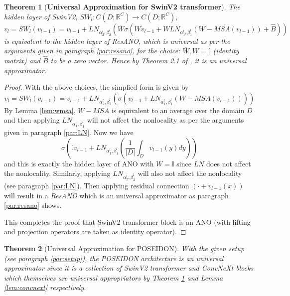 \documentclass[reqno,10pt]{amsart}
\theoremstyle{plain}
\newtheorem{thm}{Theorem}
\theoremstyle{definition}
\newcommand{\bb}[1]{\mathbb{#1}}
\begin{document}
\begin{thm}[{\bf Universal Approximation for SwinV2 transformer}] \label{thm:swinv2}
    The hidden layer of SwinV2, $SW_l : C(D;\bb R^C) \to C(D;\bb R^C)$,
    $$ v_l = SW_l(v_{l-1}) = v_{l-1} + LN_{\alpha_2^l, \beta_2^l} \left(\overline{W} \sigma \left( Wv_{l-1} + WLN_{\alpha_1^l,\beta_1^l}(W-MSA(v_{l-1})) + \hat{B}\right)\right)$$
    is equivalent to the hidden layer of ResANO, which is universal as per the arguments given in paragraph \ref{par:resano}, for the choice: $\overline{W}, W = \bb I$ (identity matrix) and $\hat{B}$ to be a zero vector. Hence by Theorem 2.1 of \cite{SL2024}, it is an universal approximator.
\end{thm}
\begin{proof}
    With the above choices, the simplied form is given by
    $$ v_l = SW_l(v_{l-1}) = v_{l-1} + LN_{\alpha_2^l, \beta_2^l} \left(\sigma \left(v_{l-1} + LN_{\alpha_1^l,\beta_1^l}(W-MSA(v_{l-1}))\right)\right)$$
    By Lemma \ref{lem:wmsa}, $W-MSA$ is equivalent to an average over the domain $D$ and then applying $LN_{\alpha_1^l, \beta_1^l}$ will not affect the nonlocality as per the arguments given in paragraph \ref{par:LN}. Now we have
    $$ \sigma\left(\bb Iv_{l-1} + LN_{\alpha_1^l, \beta_1^l}\left( \frac{1}{|D|} \int_D v_{l-1}(y)dy\right) \right)$$ and this is exactly the hidden layer of ANO \cite{SL2024} with $W = \bb I$ since $LN$ does not affect the nonlocality. Similarly, applying $LN_{\alpha_2^l, \beta_2^l}$ will also not affect the nonlocality (see paragraph \ref{par:LN}).
    Then applying residual connection $(\cdot + v_{l-1}(x))$ will result in a {\it ResANO} which is an universal approximator as paragraph \ref{par:resano} shows.
    
    \noindent This completes the proof that SwinV2 transformer block is an ANO (with lifting and projection operators are taken as identity operator).
\end{proof}
\begin{thm}[Universal Approximation for POSEIDON]
    With the given setup (see paragraph \ref{par:setup}), the POSEIDON architecture is an universal approximator since it is a collection of SwinV2 transformer and ConvNeXt blocks which themselves are universal appropriators by Theorem \ref{thm:swinv2} and Lemma \ref{lem:convnext} respectively.
\end{thm}
\end{document}
